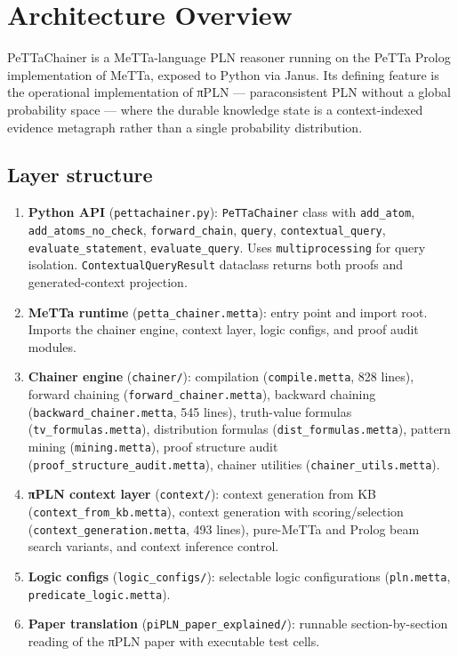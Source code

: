 \documentclass[11pt]{article}
\begin{document}
\section{Architecture Overview}

PeTTaChainer is a MeTTa-language PLN reasoner running on the PeTTa Prolog
implementation of MeTTa, exposed to Python via Janus. Its defining feature is the
operational implementation of πPLN --- paraconsistent PLN without a global
probability space --- where the durable knowledge state is a context-indexed
evidence metagraph rather than a single probability distribution.

\subsection{Layer structure}

\begin{enumerate}[nosep]
  \item \textbf{Python API} (\texttt{pettachainer.py}): \texttt{PeTTaChainer} class
  with \texttt{add\_atom}, \texttt{add\_atoms\_no\_check}, \texttt{forward\_chain},
  \texttt{query}, \texttt{contextual\_query}, \texttt{evaluate\_statement},
  \texttt{evaluate\_query}. Uses \texttt{multiprocessing} for query isolation.
  \texttt{ContextualQueryResult} dataclass returns both proofs and generated-context
  projection.
  \item \textbf{MeTTa runtime} (\texttt{petta\_chainer.metta}): entry point and
  import root. Imports the chainer engine, context layer, logic configs, and
  proof audit modules.
  \item \textbf{Chainer engine} (\texttt{chainer/}): compilation
  (\texttt{compile.metta}, 828 lines), forward chaining
  (\texttt{forward\_chainer.metta}), backward chaining
  (\texttt{backward\_chainer.metta}, 545 lines), truth-value formulas
  (\texttt{tv\_formulas.metta}), distribution formulas
  (\texttt{dist\_formulas.metta}), pattern mining (\texttt{mining.metta}), proof
  structure audit (\texttt{proof\_structure\_audit.metta}), chainer utilities
  (\texttt{chainer\_utils.metta}).
  \item \textbf{πPLN context layer} (\texttt{context/}): context generation from
  KB (\texttt{context\_from\_kb.metta}), context generation with scoring/selection
  (\texttt{context\_generation.metta}, 493 lines), pure-MeTTa and Prolog beam
  search variants, and context inference control.
  \item \textbf{Logic configs} (\texttt{logic\_configs/}): selectable logic
  configurations (\texttt{pln.metta}, \texttt{predicate\_logic.metta}).
  \item \textbf{Paper translation} (\texttt{piPLN\_paper\_explained/}): runnable
  section-by-section reading of the πPLN paper with executable test cells.
\end{enumerate}
\end{document}
